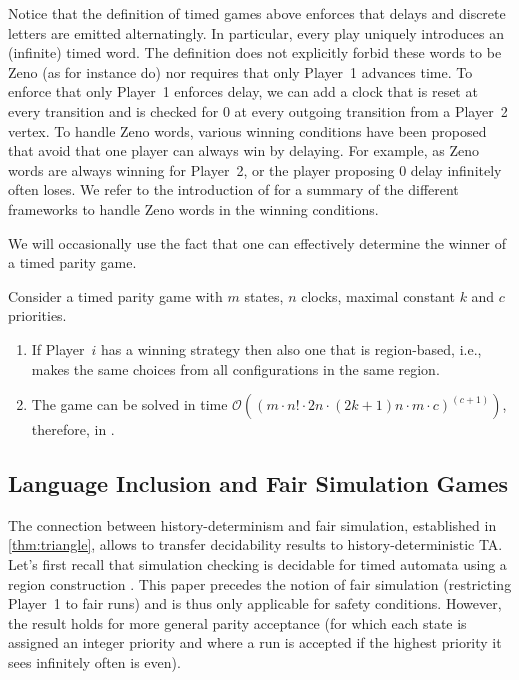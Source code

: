\begin{remark}
    Notice that the definition of timed games above enforces that delays and discrete letters are emitted alternatingly. In particular, every play uniquely introduces an (infinite) timed word.
    The definition does not explicitly forbid these words to be Zeno (as for instance \cite{CHP08} do)
    nor requires that only Player~1 advances time.
    To enforce that only Player~1 enforces delay, we can add a clock that is reset at every transition and is checked for $0$ at every outgoing transition from a Player~2 vertex.    
    To handle Zeno words, various winning conditions have been proposed that avoid that one player can always win by delaying. For example, as Zeno words are always winning for Player~2, or the player proposing $0$ delay infinitely often loses. We refer to the introduction of \cite{DFHM03} for a summary of the different frameworks to handle Zeno words in the winning conditions.
    
\end{remark}

We will occasionally use the fact that one can effectively determine the winner of a timed parity game.

\begin{theorem}
    \label{lem:TPG}
    \label{lem:tg-region-strategies}
        Consider a timed parity game with $m$ states, $n$ clocks, maximal constant $k$ and $c$ priorities.
    \begin{enumerate}
        \item If Player~$i$ has a winning strategy then also one that is region-based, i.e., makes the same choices from all configurations in the same region.
        \item The game can be solved in time $\mathcal{O}((m\cdot n!\cdot 2n\cdot (2k+1)n\cdot m\cdot c)^{(c+1)})$, therefore, in \exptime.
    \end{enumerate}
\end{theorem}


\subsection{Language Inclusion and Fair Simulation Games}
The connection between history-determinism and fair simulation, established in \cref{thm:triangle},
allows to transfer decidability results to history-deterministic TA.
Let's first recall that simulation checking is decidable for timed automata using a region construction
\cite{TAKB96}.
This paper precedes the notion of fair simulation (restricting Player~1 to fair runs)
and is thus only applicable for safety conditions. However, the result holds for more general parity acceptance
(for which each state is assigned an integer priority and where a run is accepted if the highest priority it sees infinitely often is even).

